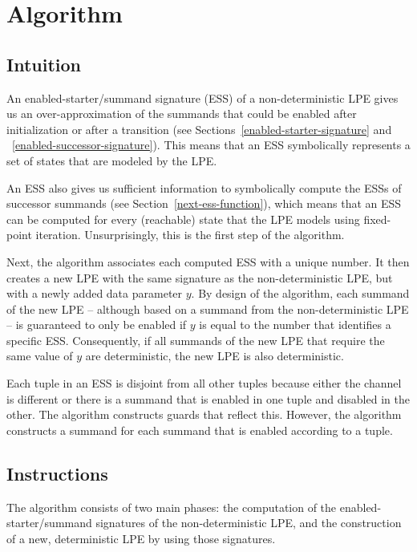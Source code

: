 \chapter{Algorithm}

\section{Intuition}

An enabled-starter/summand signature (ESS) of a non-deterministic LPE gives us an over-approximation of the summands that could be enabled after initialization or after a transition (see Sections~\ref{enabled-starter-signature} and ~\ref{enabled-successor-signature}).
This means that an ESS symbolically represents a set of states that are modeled by the LPE.

An ESS also gives us sufficient information to symbolically compute the ESSs of successor summands (see Section~\ref{next-ess-function}), which means that an ESS can be computed for every (reachable) state that the LPE models using fixed-point iteration.
Unsurprisingly, this is the first step of the algorithm.

Next, the algorithm associates each computed ESS with a unique number.
It then creates a new LPE with the same signature as the non-deterministic LPE, but with a newly added data parameter $y$.
By design of the algorithm, each summand of the new LPE -- although based on a summand from the non-deterministic LPE -- is guaranteed to only be enabled if $y$ is equal to the number that identifies a specific ESS.
Consequently, if all summands of the new LPE that require the same value of $y$ are deterministic, the new LPE is also deterministic.

Each tuple in an ESS is disjoint from all other tuples because either the channel is different or there is a summand that is enabled in one tuple and disabled in the other.
The algorithm constructs guards that reflect this.
However, the algorithm constructs a summand for each summand that is enabled according to a tuple.

\section{Instructions}

The algorithm consists of two main phases: the computation of the enabled-starter/summand signatures of the non-deterministic LPE, and the construction of a new, deterministic LPE by using those signatures.

